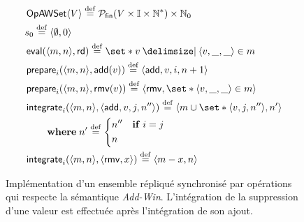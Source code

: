 \begin{figure}[tb]
\centering
\begin{align*}
&\trm{OpAWSet}\tuple*{V} \defeq \powerfset{V \times \mathbb{I} \times \mathbb{N}^*} \times \mathbb{N}_0\\
&s_0 \defeq \tuple*{\emptyset, 0}\\
&\trm{eval}(\tuple*{m, n}, \trm{rd}) \defeq \set*{v \given \tuple*{v, \_, \_} \in m}\\
&\trm{prepare}_i(\tuple*{m, n}, \trm{add}(v)) \defeq \tuple*{\trm{add}, v, i, n+1}\\
&\trm{prepare}_i(\tuple*{m, n}, \trm{rmv}(v)) \defeq \tuple*{\trm{rmv}, \set*{\tuple*{v, \_, \_} \in m}}\\
&\begin{aligned}
\MoveEqLeft\trm{integrate}_i(\tuple*{m, n}, \tuple*{\trm{add}, v, j, n''}) \defeq \tuple{m \cup \set*{\tuple*{v, j, n''}}, n'}\\
    &\where n' \defeq \begin{dcases}
        n'' & \when i = j\\
        n
    \end{dcases}
\end{aligned}\\
&\trm{integrate}_i(\tuple*{m, n}, \tuple*{\trm{rmv}, x}) \defeq \tuple*{m \sminus x, n}
\end{align*}
\caption[Implémentation d'un ensemble répliqué synchronisé par opérations]{Implémentation d'un ensemble répliqué synchronisé par opérations qui respecte la sémantique \emph{Add-Win}.
L'intégration de la suppression d'une valeur est effectuée après l'intégration de son ajout.}\label{fig:op-add-win-set}
\end{figure}

